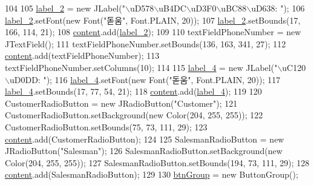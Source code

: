 \begin{DoxyCode}
104         
105         \hyperlink{classpkg_1_1_person_u_i_af40d666a6f4a8b9fd70d773377b85d23}{label\_2} = \textcolor{keyword}{new} JLabel(\textcolor{stringliteral}{"\(\backslash\)uD578\(\backslash\)uB4DC\(\backslash\)uD3F0\(\backslash\)uBC88\(\backslash\)uD638: "});
106         \hyperlink{classpkg_1_1_person_u_i_af40d666a6f4a8b9fd70d773377b85d23}{label\_2}.setFont(\textcolor{keyword}{new} Font(\textcolor{stringliteral}{"돋움"}, Font.PLAIN, 20));
107         \hyperlink{classpkg_1_1_person_u_i_af40d666a6f4a8b9fd70d773377b85d23}{label\_2}.setBounds(17, 166, 114, 21);
108         \hyperlink{classpkg_1_1_person_u_i_a05931d9e728132b35d239a5229eea21d}{content}.add(\hyperlink{classpkg_1_1_person_u_i_af40d666a6f4a8b9fd70d773377b85d23}{label\_2});
109         
110         textFieldPhoneNumber = \textcolor{keyword}{new} JTextField();
111         textFieldPhoneNumber.setBounds(136, 163, 341, 27);
112         \hyperlink{classpkg_1_1_person_u_i_a05931d9e728132b35d239a5229eea21d}{content}.add(textFieldPhoneNumber);
113         textFieldPhoneNumber.setColumns(10);
114         
115         \hyperlink{classpkg_1_1_person_u_i_ace0f99b0457a8e521a18fb1026b7c885}{label\_4} = \textcolor{keyword}{new} JLabel(\textcolor{stringliteral}{"\(\backslash\)uC120\(\backslash\)uD0DD: "});
116         \hyperlink{classpkg_1_1_person_u_i_ace0f99b0457a8e521a18fb1026b7c885}{label\_4}.setFont(\textcolor{keyword}{new} Font(\textcolor{stringliteral}{"돋움"}, Font.PLAIN, 20));
117         \hyperlink{classpkg_1_1_person_u_i_ace0f99b0457a8e521a18fb1026b7c885}{label\_4}.setBounds(17, 77, 54, 21);
118         \hyperlink{classpkg_1_1_person_u_i_a05931d9e728132b35d239a5229eea21d}{content}.add(\hyperlink{classpkg_1_1_person_u_i_ace0f99b0457a8e521a18fb1026b7c885}{label\_4});
119         
120         CustomerRadioButton = \textcolor{keyword}{new} JRadioButton(\textcolor{stringliteral}{"Customer"});
121         CustomerRadioButton.setBackground(\textcolor{keyword}{new} Color(204, 255, 255));
122         CustomerRadioButton.setBounds(75, 73, 111, 29);
123         \hyperlink{classpkg_1_1_person_u_i_a05931d9e728132b35d239a5229eea21d}{content}.add(CustomerRadioButton);
124         
125         SalesmanRadioButton = \textcolor{keyword}{new} JRadioButton(\textcolor{stringliteral}{"Salesman"});
126         SalesmanRadioButton.setBackground(\textcolor{keyword}{new} Color(204, 255, 255));
127         SalesmanRadioButton.setBounds(194, 73, 111, 29);
128         \hyperlink{classpkg_1_1_person_u_i_a05931d9e728132b35d239a5229eea21d}{content}.add(SalesmanRadioButton);
129         
130         \hyperlink{classpkg_1_1_person_u_i_ab021b25096eb0dec11276a56b226dc42}{btnGroup} = \textcolor{keyword}{new} ButtonGroup();

\end{DoxyCode}
